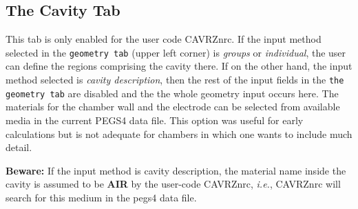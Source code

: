 \documentclass[12pt,twoside]{article}   %
\newcommand{\ie}{{\em i.e.}}
\begin{document}
\newpage
\subsection{The Cavity Tab}

This tab is only enabled for the user code CAVRZnrc. If the input method selected in the 
{\tt geometry tab} (upper left corner) is {\em groups} or {\em individual}, the user can
define the regions comprising the cavity there. If on the other hand, the input method selected
is {\em cavity description}, then the rest of the input fields in the {\tt the geometry tab} 
are disabled and the the whole geometry input occurs here. The materials for the chamber wall
and the electrode can be selected from available media in the current PEGS4 data file.
This option was useful for early calculations but is not adequate for chambers in which one 
wants to include much detail. 

{\bf Beware:} If the input method is cavity description, the material name inside the cavity is 
assumed to be {\bf AIR} by the user-code CAVRZnrc, \ie, CAVRZnrc will search for this medium in 
the pegs4 data file. \\ \\
\end{document}
